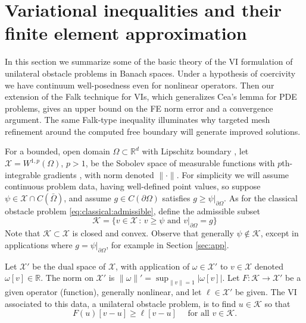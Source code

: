 \documentclass[]{interact}
\theoremstyle{plain}%
\theoremstyle{definition}
\theoremstyle{remark}
\newcommand{\RR}{\mathbb{R}}
\newcommand{\cK}{\mathcal{K}}
\newcommand{\cX}{\mathcal{X}}
\begin{document}
\section{Variational inequalities and their finite element approximation} \label{sec:vifem}

In this section we summarize some of the basic theory of the VI formulation of unilateral obstacle problems in Banach spaces.  Under a hypothesis of coercivity we have continuum well-posedness even for nonlinear operators.  Then our extension of the Falk \cite{Falk1974} technique for VIs, which generalizes Cea's lemma \cite{ElmanSilvesterWathen2014} for PDE problems, gives an upper bound on the FE norm error and a convergence argument.  The same Falk-type inequality illuminates why targeted mesh refinement around the computed free boundary will generate improved solutions.

For a bounded, open domain $\Omega \subset \RR^d$ with Lipschitz boundary \cite{Ciarlet2002}, let $\cX = W^{1,p}(\Omega)$, $p>1$, be the Sobolev space of measurable functions with $p$th-integrable gradients \cite{Evans2010}, with norm denoted $\|\cdot\|$.  For simplicity we will assume continuous problem data, having well-defined point values, so suppose $\psi \in \cX \cap C(\bar\Omega)$, and assume $g\in C(\partial \Omega)$ satisfies $g \ge \psi|_{\partial\Omega}$.  As for the classical obstacle problem \eqref{eq:classical:admissible}, define the admissible subset
\begin{equation} \label{eq:admissible}
\cK = \{v \in \cX \,:\, v \ge \psi \text{ and } v|_{\partial \Omega} = g\}
\end{equation}
Note that $\cK\subset \cX$ is closed and convex.  Observe that generally $\psi\notin\cK$, except in applications where $g = \psi|_{\partial\Omega}$, for example in Section \ref{sec:app}.

Let $\cX'$ be the dual space of $\cX$, with application of $\omega \in \cX'$ to $v\in \cX$ denoted $\omega[v] \in \RR$.  The norm on $\cX'$ is $\|\omega\|' = \sup_{\|v\|=1} |\omega[v]|$.  Let $F:\cK \to \cX'$ be a given operator (function), generally nonlinear, and let $\ell\in \cX'$ be given.  The VI associated to this data, a unilateral obstacle problem, is to find $u\in \cK$ so that
\begin{equation} \label{eq:vi}
F(u)[v - u] \ge \ell[v - u] \quad \text{ for all } v \in \cK.
\end{equation}
\end{document}
